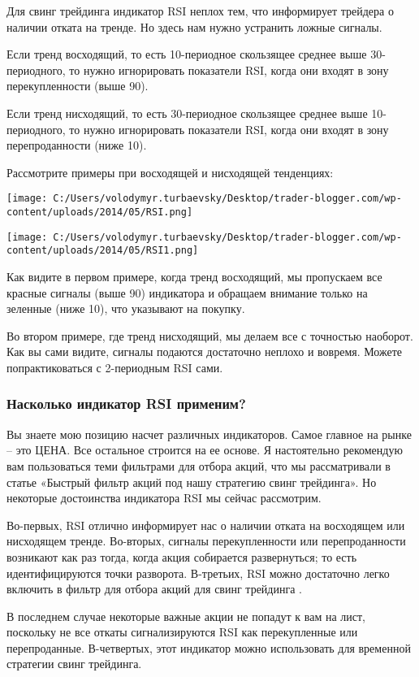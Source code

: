\documentclass[a5paper]{article}
\begin{document}
Для свинг трейдинга индикатор RSI неплох тем, что информирует трейдера о наличии отката на тренде. Но здесь нам нужно устранить ложные сигналы.

Если тренд восходящий, то есть 10-периодное скользящее среднее выше 30-периодного, то нужно игнорировать показатели RSI, когда они входят в зону перекупленности (выше 90).

Если тренд нисходящий, то есть 30-периодное скользящее среднее выше 10-периодного, то нужно игнорировать показатели RSI, когда они входят в зону перепроданности (ниже 10).

Рассмотрите примеры при восходящей и нисходящей тенденциях:

\texttt{[image: C:/Users/volodymyr.turbaevsky/Desktop/trader-blogger.com/wp-content/uploads/2014/05/RSI.png]}

\texttt{[image: C:/Users/volodymyr.turbaevsky/Desktop/trader-blogger.com/wp-content/uploads/2014/05/RSI1.png]}

Как видите в первом примере, когда тренд восходящий, мы пропускаем все красные сигналы (выше 90) индикатора и обращаем внимание только на зеленные (ниже 10), что указывают на покупку.

Во втором примере, где тренд нисходящий, мы делаем все с точностью
наоборот. Как вы сами видите, сигналы подаются достаточно неплохо и
вовремя. Можете попрактиковаться с 2-периодным RSI сами.

\subsubsection{Насколько индикатор RSI применим?}

Вы знаете мою позицию насчет различных индикаторов. Самое главное на рынке – это ЦЕНА. Все остальное строится на ее основе. Я настоятельно рекомендую вам пользоваться теми фильтрами для отбора акций, что мы рассматривали в статье «Быстрый фильтр акций под нашу стратегию свинг трейдинга». Но некоторые достоинства индикатора RSI мы сейчас рассмотрим.

Во-первых, RSI отлично информирует нас о наличии отката на восходящем или нисходящем тренде. Во-вторых, сигналы перекупленности или перепроданности возникают как раз тогда, когда акция собирается развернуться; то есть идентифицируются точки разворота. В-третьих, RSI можно достаточно легко включить в фильтр для отбора акций для свинг трейдинга .

В последнем случае некоторые важные акции не попадут к вам на лист, поскольку не все откаты сигнализируются RSI как перекупленные или перепроданные. В-четвертых, этот индикатор можно использовать для временной стратегии свинг трейдинга.
\end{document}
